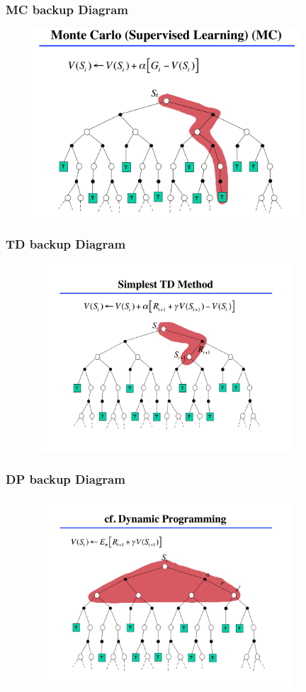 \documentclass[handout]{beamer}
\begin{document}
\begin{frame}
\frametitle{MC backup Diagram}
\includegraphics[width=12cm, height=7cm]{mc_backup.png}
\end{frame}

\begin{frame}
\frametitle{TD backup Diagram}
\includegraphics[width=12cm, height=7cm]{td_backup.png}
\end{frame}


\begin{frame}
\frametitle{DP backup Diagram}
\includegraphics[width=12cm, height=7cm]{dp_backup.png}
\end{frame}
\end{document}
